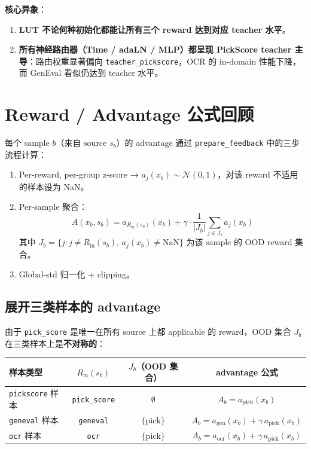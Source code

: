 \documentclass[11pt,a4paper]{article}
\begin{document}
\textbf{核心异象}：
\begin{enumerate}
    \item \textbf{LUT 不论何种初始化都能让所有三个 reward 达到对应 teacher 水平}。
    \item \textbf{所有神经路由器（Time / adaLN / MLP）都呈现 PickScore teacher 主导}：路由权重显著偏向 \texttt{teacher\_pickscore}，OCR 的 in-domain 性能下降，而 GenEval 看似仍达到 teacher 水平。
\end{enumerate}

\section{Reward / Advantage 公式回顾}

每个 sample $b$（来自 source $s_b$）的 advantage 通过 \texttt{prepare\_feedback} 中的三步流程计算：

\begin{enumerate}
    \item Per-reward, per-group z-score → $a_j(x_b) \sim \mathcal{N}(0, 1)$，对该 reward 不适用的样本设为 NaN。
    \item Per-sample 聚合：
        \begin{equation}
        A(x_b, s_b) = a_{R_{\text{in}}(s_b)}(x_b) + \gamma \cdot \frac{1}{|J_b|} \sum_{j \in J_b} a_j(x_b)
        \label{eq:advantage}
        \end{equation}
        其中 $J_b = \{j : j \neq R_{\text{in}}(s_b),\, a_j(x_b) \neq \text{NaN}\}$ 为该 sample 的 OOD reward 集合。
    \item Global-std 归一化 + clipping。
\end{enumerate}

\subsection{展开三类样本的 advantage}

由于 \texttt{pick\_score} 是唯一在所有 source 上都 applicable 的 reward，OOD 集合 $J_b$ 在三类样本上是\textbf{不对称的}：

\begin{center}
\begin{tabular}{l|c|c|c}
\toprule
\textbf{样本类型} & \textbf{$R_{\text{in}}(s_b)$} & \textbf{$J_b$（OOD 集合）} & \textbf{advantage 公式} \\
\midrule
\texttt{pickscore} 样本 & \texttt{pick\_score} & $\emptyset$ &
    $A_b = a_{\text{pick}}(x_b)$ \\
\midrule
\texttt{geneval} 样本 & \texttt{geneval} & $\{\text{pick}\}$ &
    $A_b = a_{\text{gen}}(x_b) + \gamma\,a_{\text{pick}}(x_b)$ \\
\midrule
\texttt{ocr} 样本 & \texttt{ocr} & $\{\text{pick}\}$ &
    $A_b = a_{\text{ocr}}(x_b) + \gamma\,a_{\text{pick}}(x_b)$ \\
\bottomrule
\end{tabular}
\end{center}
\end{document}
